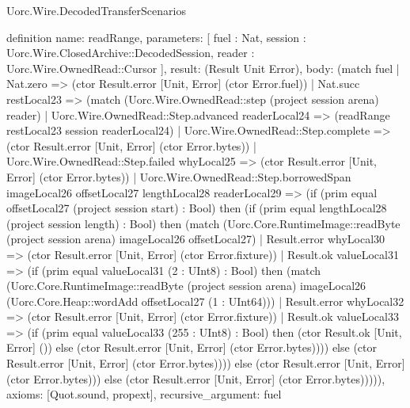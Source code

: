 \begin{lexlean}{Uorc.Wire.DecodedTransferScenarios}
\begin{semanticmodule}
definition{
  name: readRange,
  parameters: [
    fuel : Nat,
    session : Uorc.Wire.ClosedArchive::DecodedSession,
    reader : Uorc.Wire.OwnedRead::Cursor
  ],
  result: (Result Unit Error),
  body: (match fuel
    | Nat.zero => (ctor Result.error [Unit, Error] (ctor Error.fuel))
    | Nat.succ restLocal23 => (match (Uorc.Wire.OwnedRead::step (project session arena) reader)
      | Uorc.Wire.OwnedRead::Step.advanced readerLocal24 => (readRange restLocal23 session readerLocal24)
      | Uorc.Wire.OwnedRead::Step.complete => (ctor Result.error [Unit, Error] (ctor Error.bytes))
      | Uorc.Wire.OwnedRead::Step.failed whyLocal25 => (ctor Result.error [Unit, Error] (ctor Error.bytes))
      | Uorc.Wire.OwnedRead::Step.borrowedSpan imageLocal26 offsetLocal27 lengthLocal28 readerLocal29 => (if (prim equal offsetLocal27 (project session start) : Bool) then (if (prim equal lengthLocal28 (project session length) : Bool) then (match (Uorc.Core.RuntimeImage::readByte (project session arena) imageLocal26 offsetLocal27)
        | Result.error whyLocal30 => (ctor Result.error [Unit, Error] (ctor Error.fixture))
        | Result.ok valueLocal31 => (if (prim equal valueLocal31 (2 : UInt8) : Bool) then (match (Uorc.Core.RuntimeImage::readByte (project session arena) imageLocal26 (Uorc.Core.Heap::wordAdd offsetLocal27 (1 : UInt64)))
          | Result.error whyLocal32 => (ctor Result.error [Unit, Error] (ctor Error.fixture))
          | Result.ok valueLocal33 => (if (prim equal valueLocal33 (255 : UInt8) : Bool) then (ctor Result.ok [Unit, Error] ()) else (ctor Result.error [Unit, Error] (ctor Error.bytes)))) else (ctor Result.error [Unit, Error] (ctor Error.bytes)))) else (ctor Result.error [Unit, Error] (ctor Error.bytes))) else (ctor Result.error [Unit, Error] (ctor Error.bytes))))),
  axioms: [Quot.sound, propext],
  recursive_argument: fuel
}


\end{semanticmodule}
\end{lexlean}
